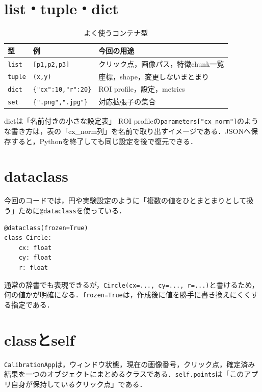 \documentclass[a4paper,11pt]{ltjsreport}
\begin{document}
\section{list・tuple・dict}
\begin{table}[H]
\centering
\caption{よく使うコンテナ型}
\begin{tabularx}{\linewidth}{L{28mm} L{52mm} Y}
\toprule
型 & 例 & 今回の用途 \\
\midrule
\texttt{list} & \texttt{[p1,p2,p3]} & クリック点，画像パス，特徴chunk一覧 \\
\texttt{tuple} & \texttt{(x,y)} & 座標，shape，変更しないまとまり \\
\texttt{dict} & \texttt{\{"cx":10,"r":20\}} & ROI profile，設定，metrics \\
\texttt{set} & \texttt{\{".png",".jpg"\}} & 対応拡張子の集合 \\
\bottomrule
\end{tabularx}
\end{table}

\begin{imagebox}{dictは「名前付きの小さな設定表」}
ROI profileの\texttt{parameters["cx\_norm"]}のような書き方は，表の「cx\_norm列」を名前で取り出すイメージである．JSONへ保存すると，Pythonを終了しても同じ設定を後で復元できる．
\end{imagebox}

\section{dataclass}
今回のコードでは，円や実験設定のように「複数の値をひとまとまりとして扱う」ために\texttt{@dataclass}を使っている．

\begin{lstlisting}
@dataclass(frozen=True)
class Circle:
    cx: float
    cy: float
    r: float
\end{lstlisting}

通常の辞書でも表現できるが，\texttt{Circle(cx=..., cy=..., r=...)}と書けるため，何の値かが明確になる．\texttt{frozen=True}は，作成後に値を勝手に書き換えにくくする指定である．

\section{classとself}
\texttt{CalibrationApp}は，ウィンドウ状態，現在の画像番号，クリック点，確定済み結果を一つのオブジェクトにまとめるクラスである．\texttt{self.points}は「このアプリ自身が保持しているクリック点」である．
\end{document}
